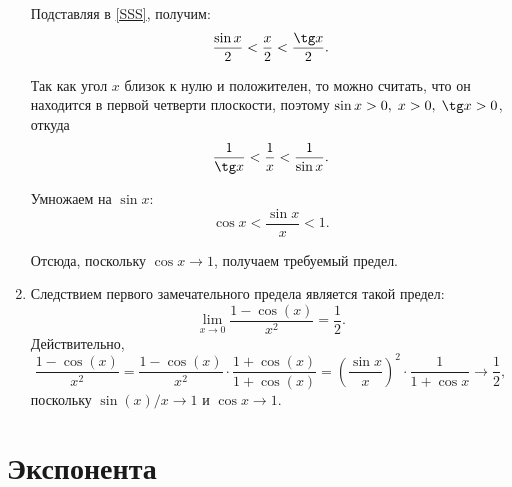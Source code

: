 \begin{enumerate}
Подставляя в \eqref{SSS}, получим:
$$
\frac{\sin x}{2} < \frac{x}{2} < \frac{\tg x}{2}.
$$

Так как угол $x$ близок к нулю и положителен, то можно считать, что он находится в первой четверти плоскости, поэтому
$\sin x > 0, \; x > 0, \; \tg x > 0$, откуда
$$
\frac{1}{\tg x} < \frac{1}{x} < \frac{1}{\sin x}.
$$

Умножаем на $\sin x$:
$$
\cos x < \frac{\sin x}{x} < 1.
$$

Отсюда, поскольку $\cos x\to 1$, получаем требуемый предел.

\item Следствием первого замечательного предела является такой предел:
$$
\lim_{x\to 0}\frac{1-\cos(x)}{x^2}=\frac 12.
$$
Действительно,
$$
\frac{1-\cos(x)}{x^2}=\frac{1-\cos(x)}{x^2}\cdot\frac{1+\cos(x)}{1+\cos(x)}
=\left(\frac{\sin x}{x}\right)^2\cdot\frac{1}{1+\cos x}\to \frac12,
$$
поскольку $\sin(x)/x\to 1$ и $\cos x\to 1$.

\end{enumerate}



\section{Экспонента}



